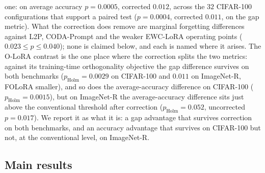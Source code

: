 one: on average accuracy $p=0.0005$, corrected $0.012$, across the $32$ CIFAR-100
configurations that support a paired test ($p=0.0004$, corrected $0.011$, on the gap
metric). What the
correction does remove are marginal forgetting differences against L2P, CODA-Prompt and the
weaker EWC-LoRA operating points ($0.023\le p\le0.040$); none is claimed below, and each is
named where it arises. The O-LoRA contrast is the one place where the correction splits the
two metrics: against its training-time orthogonality objective the gap difference survives on
both benchmarks ($p_{\mathrm{Holm}}=0.0029$ on CIFAR-100 and $0.011$ on ImageNet-R, FOLoRA
smaller), and so does the average-accuracy difference on CIFAR-100 ($p_{\mathrm{Holm}}=0.0015$),
but on ImageNet-R the average-accuracy difference sits just above the conventional threshold
after correction ($p_{\mathrm{Holm}}=0.052$, uncorrected $p=0.017$). We report it as what it
is: a gap advantage that survives correction on both benchmarks, and an accuracy advantage that
survives on CIFAR-100 but not, at the conventional level, on ImageNet-R.

\subsection{Main results}
\label{sec:main_results}







